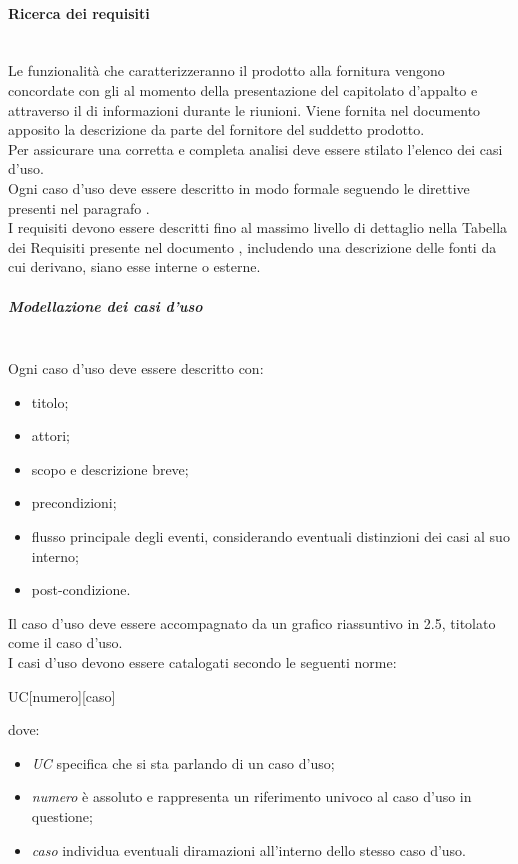 \paragraph{Ricerca dei requisiti}\mbox{}\\
Le funzionalità che caratterizzeranno il prodotto alla fornitura vengono concordate con gli  al momento della presentazione del capitolato d'appalto e attraverso il  di informazioni durante le riunioni. Viene fornita nel documento apposito \AnalisiDeiRequisiti{} la descrizione da parte del fornitore del suddetto prodotto.\\
Per assicurare una corretta e completa analisi deve essere stilato l'elenco dei casi d'uso.\\
Ogni caso d'uso deve essere descritto in modo formale seguendo le direttive presenti nel paragrafo .\\
I requisiti devono essere descritti fino al massimo livello di dettaglio nella Tabella dei Requisiti presente nel documento \AnalisiDeiRequisiti, includendo una descrizione delle fonti da cui derivano, siano esse interne o esterne.

\subparagraph{Modellazione dei casi d'uso}\mbox{}\label{modellazione-casi-uso}\\
Ogni caso d'uso deve essere descritto con:
\begin{itemize}
	\item titolo;
	\item attori;
	\item scopo e descrizione breve;
	\item precondizioni;
	\item flusso principale degli eventi, considerando eventuali distinzioni dei casi al suo interno;
	\item post-condizione.
\end{itemize}
Il caso d'uso deve essere accompagnato da un grafico riassuntivo in  2.5, titolato come il caso d'uso.\\
I casi d'uso devono essere catalogati secondo le seguenti norme:
\begin{center}
	UC[numero][caso]
\end{center}
dove:
\begin{itemize}
	\item \textit{UC} specifica che si sta parlando di un caso d'uso;
	\item \textit{numero} è assoluto e rappresenta un riferimento univoco al caso d'uso in questione;
	\item \textit{caso} individua eventuali diramazioni all'interno dello stesso caso d’uso.
\end{itemize}

